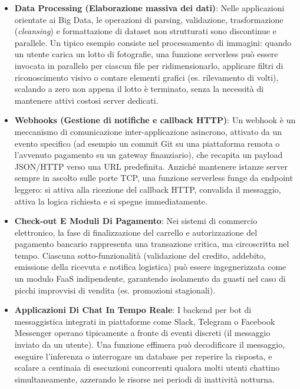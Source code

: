 \documentclass[11pt, a4paper]{article}
\begin{document}
\begin{itemize}
    \item \textbf{Data Processing (Elaborazione massiva dei dati)}: Nelle applicazioni orientate ai Big Data, le operazioni di parsing, validazione, trasformazione (\emph{cleansing}) e formattazione di dataset non strutturati sono discontinue e parallele. Un tipico esempio consiste nel processamento di immagini: quando un utente carica un lotto di fotografie, una funzione serverless può essere invocata in parallelo per ciascun file per ridimensionarlo, applicare filtri di riconoscimento visivo o contare elementi grafici (es. rilevamento di volti), scalando a zero non appena il lotto è terminato, senza la necessità di mantenere attivi costosi server dedicati.

    \item \textbf{Webhooks (Gestione di notifiche e callback HTTP)}: Un webhook è un meccanismo di comunicazione inter-applicazione asincrono, attivato da un evento specifico (ad esempio un commit Git su una piattaforma remota o l'avvenuto pagamento su un gateway finanziario), che recapita un payload JSON/HTTP verso una URL predefinita. Anziché mantenere istanze server sempre in ascolto sulle porte TCP, una funzione serverless funge da endpoint leggero: si attiva alla ricezione del callback HTTP, convalida il messaggio, attiva la logica richiesta e si spegne immediatamente.

    \item \textbf{Check-out E Moduli Di Pagamento}: Nei sistemi di commercio elettronico, la fase di finalizzazione del carrello e autorizzazione del pagamento bancario rappresenta una transazione critica, ma circoscritta nel tempo. Ciascuna sotto-funzionalità (validazione del credito, addebito, emissione della ricevuta e notifica logistica) può essere ingegnerizzata come un modulo FaaS indipendente, garantendo isolamento da guasti nel caso di picchi improvvisi di vendita (es. promozioni stagionali).

    \item \textbf{Applicazioni Di Chat In Tempo Reale}: I backend per bot di messaggistica integrati in piattaforme come Slack, Telegram o Facebook Messenger operano tipicamente a fronte di eventi discreti (il messaggio inviato da un utente). Una funzione effimera può decodificare il messaggio, eseguire l'inferenza o interrogare un database per reperire la risposta, e scalare a centinaia di esecuzioni concorrenti qualora molti utenti chattino simultaneamente, azzerando le risorse nei periodi di inattività notturna.
\end{itemize}
\end{document}
